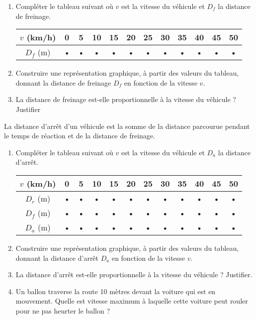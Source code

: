 \begin{enumerate}
\item Compléter le tableau suivant où $v$ est la vitesse du véhicule et $D_f$ la distance de freinage.

\begin{tabular}{|c|c|c|c|c|c|c|c|c|c|c|c|}
\hline 
$v$ (km/h) & 0 & 5 & 10 & 15 & 20 & 25 & 30 & 35 & 40 & 45 & 50 \\ 
\hline 
$D_f$ (m) & • & • & • & • & • & • & • & • & • & • & • \\ 
\hline 
\end{tabular} 

\item Construire une représentation graphique, à partir des valeurs du tableau, donnant la distance de freinage $D_f$ en fonction de la vitesse $v$.
\item La distance de freinage est-elle proportionnelle à la vitesse du véhicule ? Justifier
\end{enumerate}



La distance d’arrêt d’un véhicule est la somme de la distance parcourue pendant le temps de réaction et de la distance de freinage.

\begin{enumerate}
\item Compléter le tableau suivant où $v$ est la vitesse du véhicule et $D_a$ la distance d'arrêt.

\begin{tabular}{|c|c|c|c|c|c|c|c|c|c|c|c|}
\hline 
$v$ (km/h) & 0 & 5 & 10 & 15 & 20 & 25 & 30 & 35 & 40 & 45 & 50 \\ 
\hline 
$D_r$ (m) & • & • & • & • & • & • & • & • & • & • & • \\ 
\hline
$D_f$ (m) & • & • & • & • & • & • & • & • & • & • & • \\ 
\hline 
$D_a$ (m) & • & • & • & • & • & • & • & • & • & • & • \\ 
\hline
\end{tabular} 

\item Construire une représentation graphique, à partir des valeurs du tableau, donnant la distance d'arrêt $D_a$ en fonction de la vitesse $v$.
\item La distance d'arrêt est-elle proportionnelle à la vitesse du véhicule ? Justifier.
\item Un ballon traverse la route 10 mètres devant la voiture qui est en mouvement. Quelle est vitesse maximum à laquelle cette voiture peut rouler pour ne pas heurter le ballon ?
\end{enumerate}

